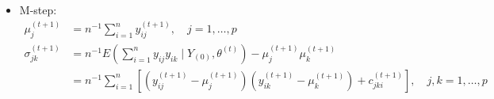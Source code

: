 \begin{example}
\begin{itemize}
        \item M-step:
              \begin{equation}
                  \begin{aligned}
                      \mu_{j}^{(t+1)}      & =n^{-1} \sum_{i=1}^{n} y_{i j}^{(t+1)}, \quad j=1, \ldots, p                                                                                                           \\
                      \sigma_{j k}^{(t+1)} & =n^{-1} E\left(\sum_{i=1}^{n} y_{i j} y_{i k} \mid Y_{(0)}, \theta^{(t)}\right)-\mu_{j}^{(t+1)} \mu_{k}^{(t+1)}                                                        \\
                                           & =n^{-1} \sum_{i=1}^{n}\left[\left(y_{i j}^{(t+1)}-\mu_{j}^{(t+1)}\right)\left(y_{i k}^{(t+1)}-\mu_{k}^{(t+1)}\right)+c_{j k i}^{(t+1)}\right], \quad j, k=1, \ldots, p
                  \end{aligned}
              \end{equation}
    \end{itemize}
\end{example}

